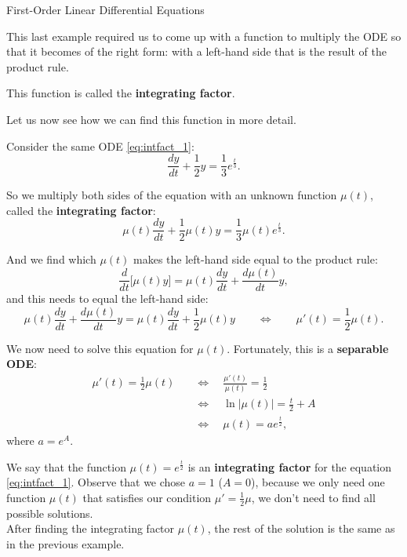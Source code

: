 \begin{submodule}{First-Order Linear Differential Equations}
\begin{example}
\end{example}


This last example required us to come up with a function to multiply the ODE so that it becomes of the right form: with a left-hand side that is the result of the product rule.

This function is called the \textbf{\color{cyan}integrating factor}.

Let us now see how we can find this function in more detail.


\begin{example}
Consider the same ODE \eqref{eq:intfact_1}:
\begin{equation}\tag{$\star$}
\frac{dy}{dt} + \frac12 y = \frac13 e^{\frac t3}.
\end{equation}

So we multiply both sides of the equation with an unknown function $\mu(t)$, called the \textbf{\color{cyan}integrating factor}:
\begin{equation}\tag{\#}\label{eq:intfactor2}
\mu(t) \frac{dy}{dt} + \frac12 \mu(t) y = \frac13 \mu(t) e^{\frac t3}.
\end{equation}

And we find which $\mu(t)$ makes the left-hand side equal to the product rule:
$$
\frac{d}{dt} \big[ \mu(t) y \big] 
	= \mu(t) \frac{dy}{dt} + \frac{d \mu(t)}{dt} y,
$$
and this needs to equal the left-hand side:
$$
\mu(t) \frac{dy}{dt} + \frac{d \mu(t)}{dt} y = \mu(t) \frac{dy}{dt} + \frac12 \mu(t) y
\qquad \Leftrightarrow \qquad
	\mu'(t) = \frac12 \mu(t).
$$

We now need to solve this equation for $\mu(t)$. Fortunately, this is a \textbf{\color{cyan}separable ODE}:
\begin{align*}
\mu'(t) = \frac12 \mu(t) \quad
	& \Leftrightarrow \quad \frac{\mu'(t)}{\mu(t)} = \frac12 \\
	& \Leftrightarrow \quad \ln |\mu(t)| = \frac t2  + A\\
	& \Leftrightarrow \quad \mu(t) = a e^{\frac t2},
\end{align*}
where $a = e^A$.

We say that the function $\mu(t) = e^{\frac t2}$ is an \textbf{\color{cyan}integrating factor} for the equation \eqref{eq:intfact_1}.
Observe that we chose $a=1$ ($A=0$), because we only need one function $\mu(t)$ that satisfies our condition $\mu' = \frac12 \mu$, we don't need to find all possible solutions. \\


After finding the integrating factor $\mu(t)$, the rest of the solution is the same as in the previous example.
%
%
\end{example}



\end{submodule}
